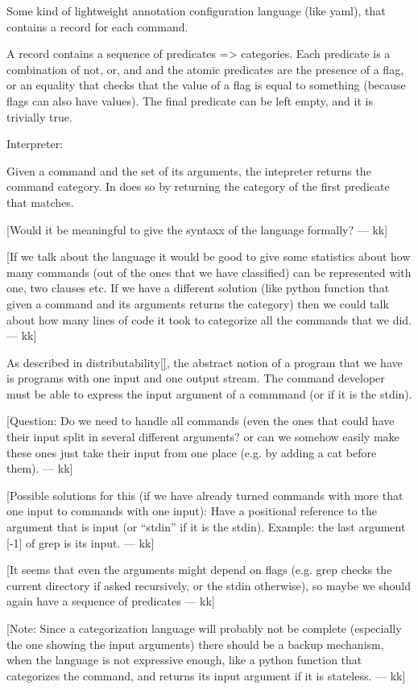 \documentclass[sigplan,10pt,review,anonymous]{acmart}
\newcommand{\kk}[1]{[{\color{magenta}#1 --- kk}]}
\begin{document}
Some kind of lightweight annotation configuration language (like
yaml), that contains a record for each command.

A record contains a sequence of predicates => categories. Each
predicate is a combination of not, or, and and the atomic predicates
are the presence of a flag, or an equality that checks that the value
of a flag is equal to something (because flags can also have
values). The final predicate can be left empty, and it is trivially true.

Interpreter:

Given a command and the set of its arguments, the intepreter returns
the command category. In does so by returning the category of the first
predicate that matches.

\kk{Would it be meaningful to give the syntaxx of the language
  formally?}

\kk{If we talk about the language it would be good to give some
  statistics about how many commands (out of the ones that we have
  classified) can be represented with one, two clauses etc. If we have
  a different solution (like python function that given a command and
  its arguments returns the category) then we could talk about how
  many lines of code it took to categorize all the commands that we
  did.}

As described in distributability\ref{}, the abstract notion of a
program that we have is programs with one input and one output
stream. The command developer must be able to express the input
argument of a commmand (or if it is the stdin).

\kk{Question: Do we need to handle all commands (even the ones that
  could have their input split in several different arguments? or can
  we somehow easily make these ones just take their input from one
  place (e.g. by adding a cat before them).}

\kk{Possible solutions for this (if we have already turned commands
  with more that one input to commands with one input): Have a
  positional reference to the argument that is input (or ``stdin'' if
  it is the stdin). Example: the last argument [-1] of grep is its
  input.}

\kk{It seems that even the arguments might depend on flags (e.g. grep
  checks the current directory if asked recursively, or the stdin
  otherwise), so maybe we should again have a sequence of predicates}


\kk{Note: Since a categorization language will probably not be
  complete (especially the one showing the input arguments) there
  should be a backup mechanism, when the language is not expressive
  enough, like a python function that categorizes the command, and
  returns its input argument if it is stateless.}
\end{document}
